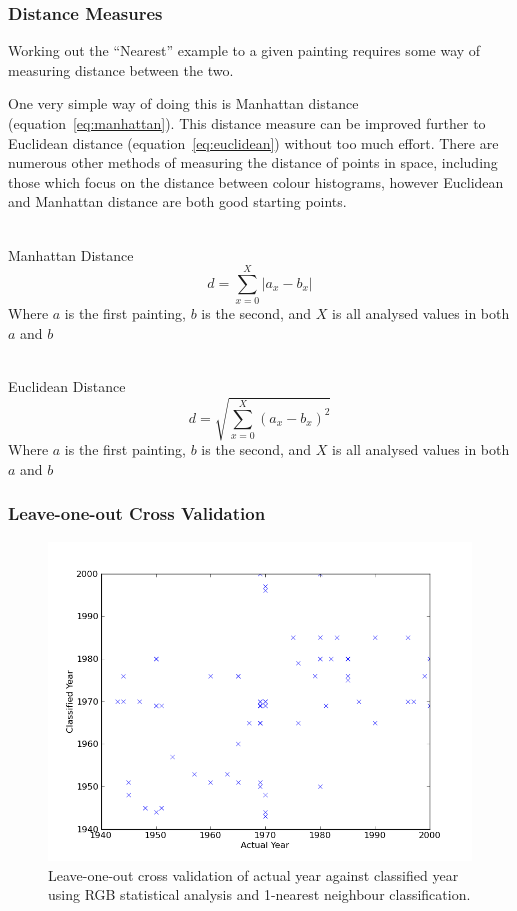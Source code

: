 \documentclass[11pt,fleqn,twoside]{article}
\begin{document}
\clearpage
\subsubsection{Distance Measures}
Working out the ``Nearest'' example to a given painting requires some way of measuring distance
between the two.

One very simple way of doing this is Manhattan distance (equation~\ref{eq:manhattan}). This distance
measure can be improved further to Euclidean distance (equation~\ref{eq:euclidean}) without too much
effort. There are numerous other methods of measuring the distance of points in space, including
those which focus on the distance between colour histograms, however Euclidean and Manhattan 
distance are both good starting points.

~\\
Manhattan Distance
\begin{equation}\label{eq:manhattan}
d = \sum^X_{x=0}{|a_x - b_x|}
\end{equation}
Where \(a\) is the first painting, \(b\) is the second, and \(X\) is all analysed values in both 
\(a\) and \(b\)

~\\
Euclidean Distance
\begin{equation}\label{eq:euclidean}
d = \sqrt{\sum^X_{x=0}{(a_x - b_x)^2}}
\end{equation}
Where \(a\) is the first painting, \(b\) is the second, and \(X\) is all analysed values in both 
\(a\) and \(b\)



\subsubsection{Leave-one-out Cross Validation}
\begin{figure}[h]
\centering
\includegraphics[scale=0.5]{img/validation-rgb-1nn.png}
\caption{Leave-one-out cross validation of actual year against classified year using RGB statistical analysis and
1-nearest neighbour classification.}
\label{fig:validation-rgb-1nn}
\end{figure}
\end{document}
